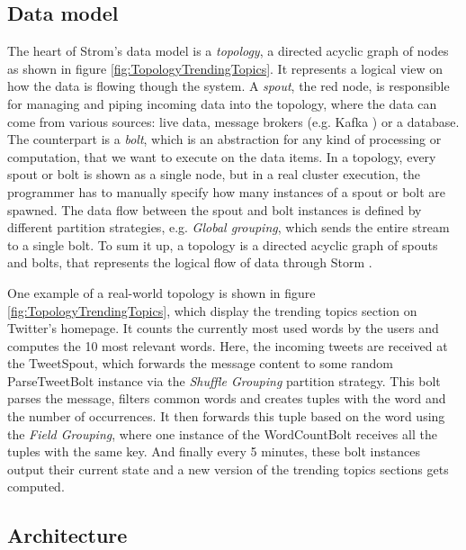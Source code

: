 \documentclass[conference]{IEEEtran}
\begin{document}
\subsection{Data model}

The heart of Strom's data model is a \emph{topology}, a directed acyclic graph of nodes as shown in figure \ref{fig:TopologyTrendingTopics}.
It represents a logical view on how the data is flowing though the system.
A \emph{spout}, the red node, is responsible for managing and piping incoming data into the topology, where the data can come from various sources: live data, message brokers (e.g. Kafka \cite{Kafka}) or a database.
The counterpart is a \emph{bolt}, which is an abstraction for any kind of processing or computation, that we want to execute on the data items.
In a topology, every spout or bolt is shown as a single node, but in a real cluster execution, the programmer has to manually specify how many instances of a spout or bolt are spawned.
The data flow between the spout and bolt instances is defined by different partition strategies, e.g. \emph{Global grouping}, which sends the entire stream to a single bolt.
To sum it up, a topology is a directed acyclic graph of spouts and bolts, that represents the logical flow of data through Storm \cite{StormTwitter}.

One example of a real-world topology is shown in figure \ref{fig:TopologyTrendingTopics}, which display the trending topics section on Twitter's homepage.
It counts the currently most used words by the users and computes the 10 most relevant words.
Here, the incoming tweets are received at the TweetSpout, which forwards the message content to some random ParseTweetBolt instance via the \emph{Shuffle Grouping} partition strategy.
This bolt parses the message, filters common words and creates tuples with the word and the number of occurrences.
It then forwards this tuple based on the word using the \emph{Field Grouping}, where one instance of the WordCountBolt receives all the tuples with the same key.
And finally every 5 minutes, these bolt instances output their current state and a new version of the trending topics sections gets computed.

\subsection{Architecture}
\end{document}
